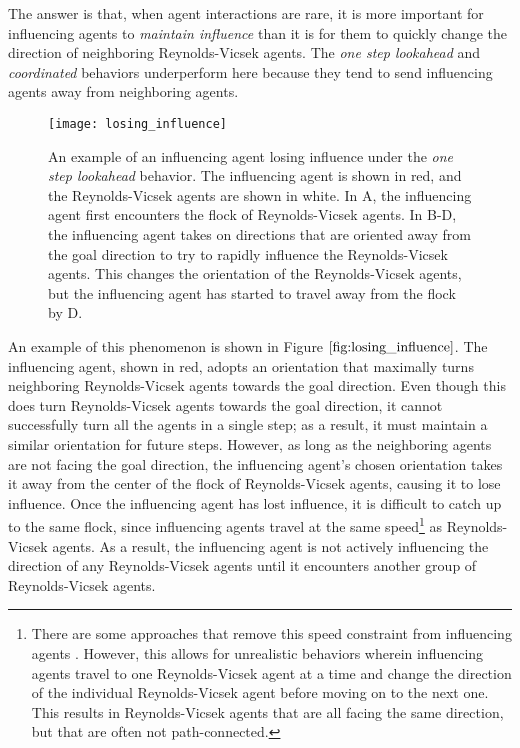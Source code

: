The answer is that, when agent interactions are rare, it is more important for
influencing agents to \textit{maintain influence} than it is for them to quickly
change the direction of neighboring Reynolds-Vicsek agents.
The \textit{one step lookahead} and \textit{coordinated} behaviors underperform
here because they tend to send influencing agents away from neighboring agents.
\begin{figure}
    \texttt{[image: losing\_influence]}
    \caption{An example of an influencing agent losing influence under the
    \textit{one step lookahead} behavior.
    The influencing agent is shown in red, and the Reynolds-Vicsek agents are
    shown in white.
    In A, the influencing agent first encounters the flock of Reynolds-Vicsek
    agents.
    In B-D, the influencing agent takes on directions that are oriented away
    from the goal direction to try to rapidly influence the Reynolds-Vicsek
    agents.
    This changes the orientation of the Reynolds-Vicsek agents, but the
    influencing agent has started to travel away from the flock by D.}
    \label{fig:losing_influence}
\end{figure}
An example of this phenomenon is shown in Figure $\ref{fig:losing_influence}$.
The influencing agent, shown in red, adopts an orientation that maximally turns
neighboring Reynolds-Vicsek agents towards the goal direction.
Even though this does turn Reynolds-Vicsek agents towards the goal direction,
it cannot successfully turn all the agents in a single step; as a result, it
must maintain a similar orientation for future steps.
However, as long as the neighboring agents are not facing the goal direction,
the influencing agent's chosen orientation takes it away from the center of the
flock of Reynolds-Vicsek agents, causing it to lose influence.
Once the influencing agent has lost influence, it is difficult to catch up to
the same flock, since influencing agents travel at the same speed\footnote{
There are some approaches that remove this speed constraint from
influencing agents \cite{han2010teleporting}.
However, this allows for unrealistic behaviors wherein influencing agents travel
to one Reynolds-Vicsek agent at a time and change the direction of the
individual Reynolds-Vicsek agent before moving on to the next one.
This results in Reynolds-Vicsek agents that are all facing the same direction,
but that are often not path-connected.}
as Reynolds-Vicsek agents.
As a result, the influencing agent is not actively influencing the direction of
any Reynolds-Vicsek agents until it encounters another group of Reynolds-Vicsek
agents.

